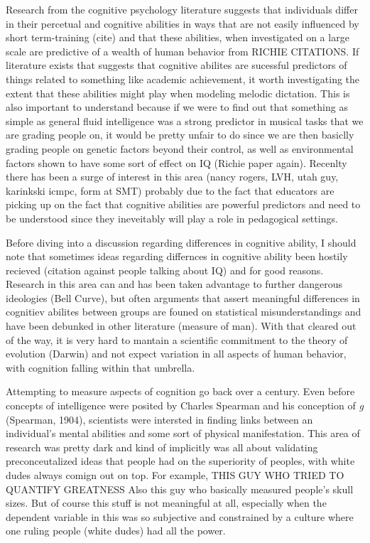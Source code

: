 \documentclass[]{book}
\theoremstyle{definition}
\theoremstyle{definition}
\theoremstyle{definition}
\theoremstyle{remark}
\begin{document}
Research from the cognitive psychology literature suggests that
individuals differ in their percetual and cognitive abilities in ways
that are not easily influenced by short term-training (cite) and that
these abilities, when investigated on a large scale are predictive of a
wealth of human behavior from RICHIE CITATIONS. If literature exists
that suggests that cognitive abilites are sucessful predictors of things
related to something like academic achievement, it worth investigating
the extent that these abilities might play when modeling melodic
dictation. This is also important to understand because if we were to
find out that something as simple as general fluid intelligence was a
strong predictor in musical tasks that we are grading people on, it
would be pretty unfair to do since we are then basiclly grading people
on genetic factors beyond their control, as well as environmental
factors shown to have some sort of effect on IQ (Richie paper again).
Recenlty there has been a surge of interest in this area (nancy rogers,
LVH, utah guy, karinkski icmpc, form at SMT) probably due to the fact
that educators are picking up on the fact that cognitive abilities are
powerful predictors and need to be understood since they ineveitably
will play a role in pedagogical settings.

Before diving into a discussion regarding differences in cognitive
ability, I should note that sometimes ideas regarding differnces in
cognitive ability been hostily recieved (citation against people talking
about IQ) and for good reasons. Research in this area can and has been
taken advantage to further dangerous ideologies (Bell Curve), but often
arguments that assert meaningful differences in cognitiev abilites
between groups are founed on statistical misunderstandings and have been
debunked in other literature (measure of man). With that cleared out of
the way, it is very hard to mantain a scientific commitment to the
theory of evolution (Darwin) and not expect variation in all aspects of
human behavior, with cognition falling within that umbrella.

Attempting to measure aspects of cognition go back over a century. Even
before concepts of intelligence were posited by Charles Spearman and his
conception of \emph{g} (Spearman, 1904), scientists were intersted in
finding links between an individual's mental abilities and some sort of
physical manifestation. This area of research was pretty dark and kind
of implicitly was all about validating preconceutalized ideas that
people had on the superiority of peoples, with white dudes always comign
out on top. For example, THIS GUY WHO TRIED TO QUANTIFY GREATNESS Also
this guy who basically measured people's skull sizes. But of course this
stuff is not meaningful at all, especially when the dependent variable
in this was so subjective and constrained by a culture where one ruling
people (white dudes) had all the power.
\end{document}
